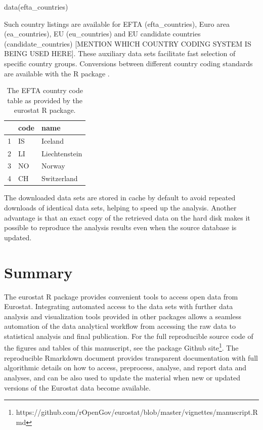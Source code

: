 \begin{example}
data(efta_countries)
\end{example}

Such country listings are available for EFTA (efta\_countries), Euro
area (ea\_countries), EU (eu\_countries) and EU candidate countries
(candidate\_countries) [MENTION WHICH COUNTRY CODING SYSTEM IS BEING
USED HERE]. These auxiliary data sets facilitate fast selection of
specific country groups. Conversions between different country coding
standards are available with the  R
package \citep{countrycode}.


\begin{table}[ht]
\centering
\begin{tabular}{rll}
\toprule
  \hline
  & code & name \\ 
  \hline
  1 & IS & Iceland \\ 
  2 & LI & Liechtenstein \\ 
  3 & NO & Norway \\ 
  4 & CH & Switzerland \\ 
   \hline
\bottomrule   
\end{tabular}
\label{tab:efta}
\caption{The EFTA country code table as provided by the eurostat R package.}
\end{table}

The downloaded data sets are stored in cache by default to avoid
repeated downloads of identical data sets, helping to speed up the
analysis. Another advantage is that an exact copy of the retrieved
data on the hard disk makes it possible to reproduce the analysis
results even when the source database is updated.


\section{Summary}

The eurostat R package provides convenient tools to access open data
from Eurostat. Integrating automated access to the data sets with
further data analysis and visualization tools provided in other
packages allows a seamless automation of the data analytical workflow
from accessing the raw data to statistical analysis and final
publication. For the full reproducible source code of the figures and
tables of this manuscript, see the package Github
site\footnote{https://github.com/rOpenGov/eurostat/blob/master/vignettes/manuscript.Rmd}. The
reproducible Rmarkdown document provides transparent documentation
with full algorithmic details on how to access, preprocess, analyse,
and report data and analyses, and can be also used to update the
material when new or updated versions of the Eurostat data become
available.

